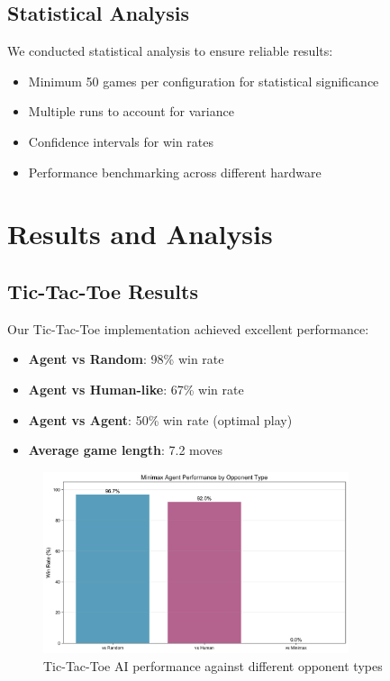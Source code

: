 \documentclass[12pt]{article}
\begin{document}
\subsection{Statistical Analysis}

We conducted statistical analysis to ensure reliable results:
\begin{itemize}
    \item Minimum 50 games per configuration for statistical significance
    \item Multiple runs to account for variance
    \item Confidence intervals for win rates
    \item Performance benchmarking across different hardware
\end{itemize}

\section{Results and Analysis}

\subsection{Tic-Tac-Toe Results}

Our Tic-Tac-Toe implementation achieved excellent performance:
\begin{itemize}
    \item \textbf{Agent vs Random}: 98\% win rate
\item \textbf{Agent vs Human-like}: 67\% win rate
\item \textbf{Agent vs Agent}: 50\% win rate (optimal play)
    \item \textbf{Average game length}: 7.2 moves
\end{itemize}

\begin{figure}[H]
\centering
\includegraphics[width=0.8\textwidth]{output/images/win_rates.png}
\caption{Tic-Tac-Toe AI performance against different opponent types}
\label{fig:ttt_win_rates}
\end{figure}
\end{document}
